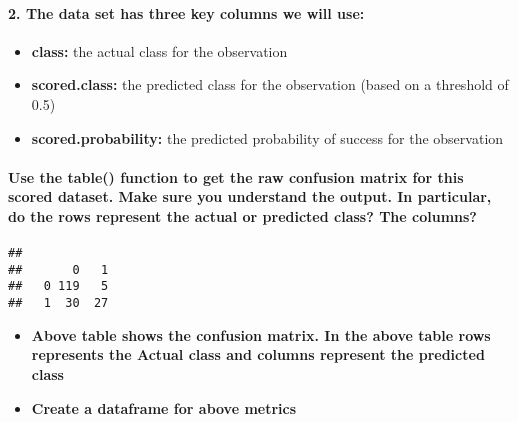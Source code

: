 \documentclass[]{article}
\newenvironment{Shaded}{\begin{snugshade}}{\end{snugshade}}
\newcommand{\KeywordTok}[1]{\textcolor[rgb]{0.13,0.29,0.53}{\textbf{#1}}}
\newcommand{\NormalTok}[1]{#1}
\newcommand{\OperatorTok}[1]{\textcolor[rgb]{0.81,0.36,0.00}{\textbf{#1}}}
\newcommand{\StringTok}[1]{\textcolor[rgb]{0.31,0.60,0.02}{#1}}
\providecommand{\tightlist}{%
  \setlength{\itemsep}{0pt}\setlength{\parskip}{0pt}}
\let\oldparagraph\paragraph
\renewcommand{\paragraph}[1]{\oldparagraph{#1}\mbox{}}
\begin{document}
\hypertarget{the-data-set-has-three-key-columns-we-will-use}{%
\paragraph{2. The data set has three key columns we will
use:}\label{the-data-set-has-three-key-columns-we-will-use}}

\begin{itemize}
\tightlist
\item
  \textbf{class:} the actual class for the observation
\item
  \textbf{scored.class:} the predicted class for the observation (based
  on a threshold of 0.5)
\item
  \textbf{scored.probability:} the predicted probability of success for
  the observation
\end{itemize}

\hypertarget{use-the-table-function-to-get-the-raw-confusion-matrix-for-this-scored-dataset.-make-sure-you-understand-the-output.-in-particular-do-the-rows-represent-the-actual-or-predicted-class-the-columns}{%
\paragraph{Use the table() function to get the raw confusion matrix for
this scored dataset. Make sure you understand the output. In particular,
do the rows represent the actual or predicted class? The
columns?}\label{use-the-table-function-to-get-the-raw-confusion-matrix-for-this-scored-dataset.-make-sure-you-understand-the-output.-in-particular-do-the-rows-represent-the-actual-or-predicted-class-the-columns}}

\begin{Shaded}
\end{Shaded}

\begin{verbatim}
##    
##       0   1
##   0 119   5
##   1  30  27
\end{verbatim}

\begin{itemize}
\item
  \textbf{Above table shows the confusion matrix. In the above table
  rows represents the Actual class and columns represent the predicted
  class}
\item
  \textbf{Create a dataframe for above metrics}
\end{itemize}
\end{document}
